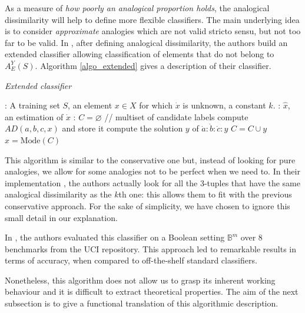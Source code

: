As a measure of \textit{how poorly an analogical proportion holds}, the
analogical dissimilarity will help to define more flexible classifiers.  The
main underlying idea is to consider {\it approximate} analogies which are not
valid stricto sensu, but not too far to be valid.
In \cite{BayMicDelIJCAI07}, after defining analogical dissimilarity,  the authors
build an extended classifier allowing classification of elements that do not
belong to $A_E^Y(S)$.  Algorithm \ref{algo_extended} gives a description of
their classifier.
\begin{algorithm}[!ht]
 \caption{\textit{Extended classifier}}
       \label{algo_extended}
       \begin{algorithmic}

      : A training set $S$, an element $x \in X$ for which
      $\dot{x}$ is unknown, a constant $k$.
      : $\hat{x}$, an estimation of $\dot{x}$
      : $C = \varnothing$ \quad \quad // multiset of candidate labels
        \STATE compute $AD(a, b, c, x)$ and store it
	    \ENDFOR
      \STATE compute the solution $y$ of $\dot{a} : \dot{b} : \dot{c} : y$
      \STATE $C = C \cup y$
    \ENDFOR
    \STATE $\hat{x} = \text{Mode}(C)$
\end{algorithmic}
\end{algorithm}

This algorithm is similar to the conservative one but, instead of looking for
pure analogies, we allow for some analogies not to be perfect when we need to.
In their implementation \cite{BayMicDelIJCAI07}, the authors actually look for
all the 3-tuples that have the same analogical dissimilarity as the $k$th one:
this allows them to fit with the previous conservative approach. For the sake of
simplicity, we have chosen to
ignore this small detail in our explanation.

In \cite{BayMicDelIJCAI07}, the authors evaluated this classifier on a Boolean setting
$\mathbb{B}^m$ over 8 benchmarks from the UCI repository.  This approach led to
remarkable results in terms of accuracy, when compared to off-the-shelf
standard classifiers.

Nonetheless, this algorithm does not allow us to grasp its inherent working
behaviour and it is difficult to extract theoretical properties. The aim of the
next subsection is to give a functional translation of this algorithmic
description.

